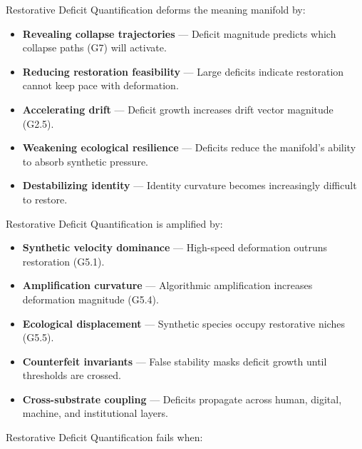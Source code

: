 \medskip

\noindent Restorative Deficit Quantification deforms the meaning manifold by:

\begin{itemize}[leftmargin=1.2cm]
    \item \textbf{Revealing collapse trajectories} — Deficit magnitude predicts
    which collapse paths (G7) will activate.

    \item \textbf{Reducing restoration feasibility} — Large deficits indicate
    restoration cannot keep pace with deformation.

    \item \textbf{Accelerating drift} — Deficit growth increases drift vector
    magnitude (G2.5).

    \item \textbf{Weakening ecological resilience} — Deficits reduce the
    manifold’s ability to absorb synthetic pressure.

    \item \textbf{Destabilizing identity} — Identity curvature becomes
    increasingly difficult to restore.
\end{itemize}

\medskip

\noindent Restorative Deficit Quantification is amplified by:

\begin{itemize}[leftmargin=1.2cm]
    \item \textbf{Synthetic velocity dominance} — High-speed deformation outruns
    restoration (G5.1).

    \item \textbf{Amplification curvature} — Algorithmic amplification increases
    deformation magnitude (G5.4).

    \item \textbf{Ecological displacement} — Synthetic species occupy restorative
    niches (G5.5).

    \item \textbf{Counterfeit invariants} — False stability masks deficit growth
    until thresholds are crossed.

    \item \textbf{Cross-substrate coupling} — Deficits propagate across human,
    digital, machine, and institutional layers.
\end{itemize}

\medskip

\noindent Restorative Deficit Quantification fails when:

